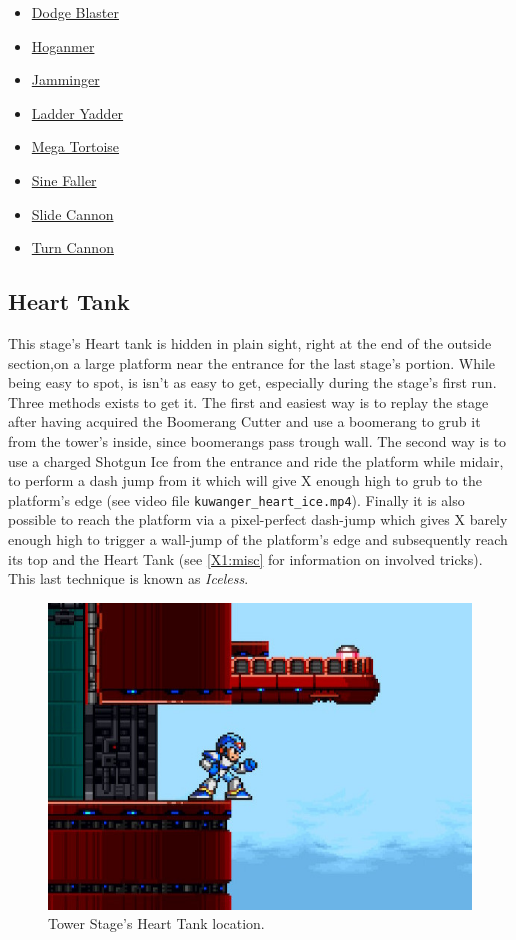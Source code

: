 \begin{itemize}
	\item \hyperlink{enem:Dodge_Blaster}{Dodge Blaster}
	\item \hyperlink{enem:Hoganmer}{Hoganmer}
	\item \hyperlink{enem:Jamminger}{Jamminger}
	\item \hyperlink{enem:Ladder_Yadder}{Ladder Yadder}
	\item \hyperlink{enem:Mega_Tortoise}{Mega Tortoise}
	\item \hyperlink{enem:Sine_Faller}{Sine Faller}
	\item \hyperlink{enem:Slide_Cannon}{Slide Cannon}
	\item \hyperlink{enem:Turn_Cannon}{Turn Cannon}
\end{itemize}

\subsection{Heart Tank}
This stage's Heart tank is hidden in plain sight, right at the end of the outside section,on a large platform near the entrance for the last stage's portion. While being easy to spot, is isn't as easy to get, especially during the stage's first run. Three methods exists to get it. The first and easiest way is to replay the stage after having acquired the Boomerang Cutter and use a boomerang to grub it from the tower's inside, since boomerangs pass trough wall. The second way is to use a charged Shotgun Ice from the entrance and ride the platform while midair, to perform a dash jump from it which will give X enough high to grub to the platform's edge (see video file \texttt{kuwanger\_heart\_ice.mp4}). Finally it is also possible to reach the platform via a pixel-perfect dash-jump which gives X barely enough high to trigger a wall-jump of the platform's edge and subsequently reach its top and the Heart Tank (see \ref{X1:misc} for information on involved tricks). This last technique is known as \textit{Iceless}. 
\begin{figure}[htp]
	\centering
	\includegraphics[width=0.5\linewidth]{figures/X1/Tower_heart.jpg}
	\caption{Tower Stage's Heart Tank location.}
\end{figure}


